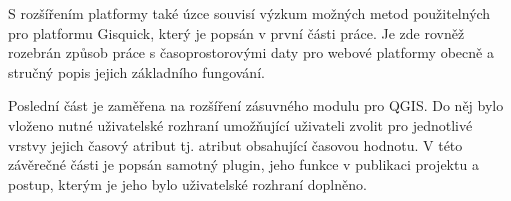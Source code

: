 S rozšířením platformy také úzce souvisí výzkum možných metod použitelných pro platformu Gisquick, který je popsán v první části práce. Je zde rovněž rozebrán způsob práce s časoprostorovými daty pro webové platformy obecně a stručný popis jejich základního fungování.

Poslední část je zaměřena na rozšíření zásuvného modulu pro QGIS. Do něj bylo vloženo nutné uživatelské rozhraní umožňující uživateli zvolit pro jednotlivé vrstvy jejich časový atribut tj. atribut obsahující časovou hodnotu. V této závěrečné části je popsán samotný plugin, jeho funkce v publikaci projektu a postup, kterým je jeho bylo uživatelské rozhraní doplněno. 

